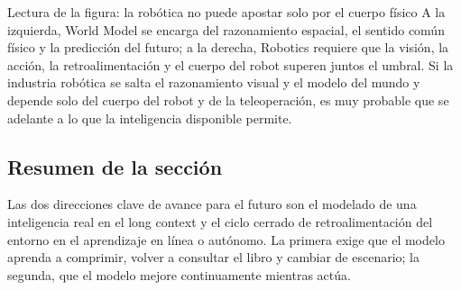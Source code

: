 \begin{knowledgebox}{Lectura de la figura: la robótica no puede apostar solo por el cuerpo físico}
A la izquierda, World Model se encarga del razonamiento espacial, el sentido común físico y la predicción del futuro; a la derecha, Robotics requiere que la visión, la acción, la retroalimentación y el cuerpo del robot superen juntos el umbral. Si la industria robótica se salta el razonamiento visual y el modelo del mundo y depende solo del cuerpo del robot y de la teleoperación, es muy probable que se adelante a lo que la inteligencia disponible permite.
\end{knowledgebox}

\subsection{Resumen de la sección}

Las dos direcciones clave de avance para el futuro son el modelado de una inteligencia real en el long context y el ciclo cerrado de retroalimentación del entorno en el aprendizaje en línea o autónomo. La primera exige que el modelo aprenda a comprimir, volver a consultar el libro y cambiar de escenario; la segunda, que el modelo mejore continuamente mientras actúa.
